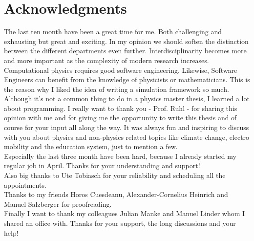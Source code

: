 

\chapter*{Acknowledgments}
The last ten month have been a great time for me. Both challenging and exhausting but great and exciting. In my opinion we should soften the distinction between the different departments even further. Interdisciplinarity becomes more and more important as the complexity of modern research increases. Computational physics requires good software engineering. Likewise, Software Engineers can benefit from the knowledge of physicists or mathematicians. This is the reason why I liked the idea of writing a simulation framework so much. Although it's not a common thing to do in a physics master thesis, I learned a lot about programming. I really want to thank you - Prof. Ruhl - for sharing this opinion with me and for giving me the opportunity to write this thesis and of course for your input all along the way. It was always fun and inspiring to discuss with you about physics and non-physics related topics like climate change, electro mobility and the education system, just to mention a few. \\
Especially the last three month have been hard, because I already started my regular job in April. Thanks for your understanding and support!\\
Also big thanks to Ute Tobiasch for your reliability and scheduling all the appointments.\\
Thanks to my friends Horos Cuesdeanu, Alexander-Cornelius Heinrich and Manuel Salzberger for proofreading.\\
Finally I want to thank my colleagues Julian Manke and Manuel Linder whom I shared an office with. Thanks for your support, the long discussions and your help! \\


